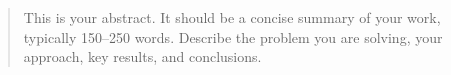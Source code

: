 \begin{abstract}
This is your abstract. It should be a concise summary of your work, typically 150--250 words. Describe the problem you are solving, your approach, key results, and conclusions.
\end{abstract}


